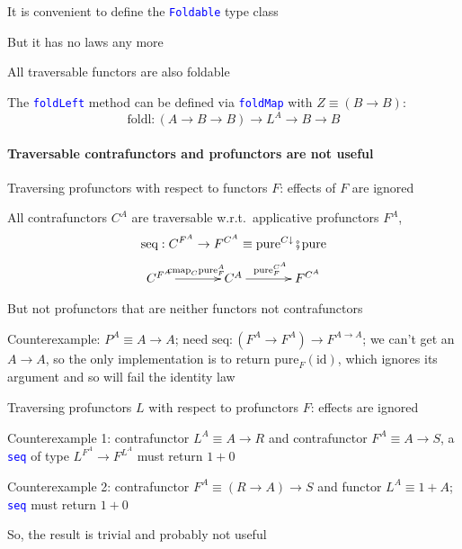 It is convenient to define the \texttt{\textcolor{blue}{\footnotesize{}Foldable}}
type class

But it has no laws any more

All traversable functors are also foldable

The \texttt{\textcolor{blue}{\footnotesize{}foldLeft}} method can
be defined via \texttt{\textcolor{blue}{\footnotesize{}foldMap}} with
$Z\equiv(B\rightarrow B)$:
\[
\text{foldl}:\left(A\rightarrow B\rightarrow B\right)\rightarrow L^{A}\rightarrow B\rightarrow B
\]


\paragraph{Traversable contrafunctors and profunctors are not useful}

\vspace{-0.15cm}Traversing profunctors with respect to functors $F$:
effects of $F$ are ignored

All contrafunctors $C^{A}$ are traversable w.r.t.~applicative profunctors
$F^{A}$,{\footnotesize{}
\[
\text{seq}:C^{F^{A}}\rightarrow F^{C^{A}}\equiv\text{pure}^{C\downarrow}\bef\text{pure}
\]
\[
\xymatrix{C^{F^{A}}\ar[r]\sp(0.5){\text{cmap}_{C}\text{pure}_{F}^{A}}\xyScaleY{0.2pc}\xyScaleX{3pc} & C^{A}\ar[r]\sp(0.5){\text{pure}_{F}^{C^{A}}} & F^{C^{A}}}
\]
}{\footnotesize\par}

But not profunctors that are neither functors not contrafunctors

Counterexample: $P^{A}\equiv A\rightarrow A$; need $\text{seq}:\left(F^{A}\rightarrow F^{A}\right)\rightarrow F^{A\rightarrow A}$;
we can't get an $A\rightarrow A$, so the only implementation is to
return $\text{pure}_{F}\left(\text{id}\right)$, which ignores its
argument and so will fail the identity law 

Traversing profunctors $L$ with respect to profunctors $F$: effects
are ignored

Counterexample 1: contrafunctor $L^{A}\equiv A\rightarrow R$ and
contrafunctor $F^{A}\equiv A\rightarrow S$, a \texttt{\textcolor{blue}{\footnotesize{}seq}}
of type $L^{F^{A}}\rightarrow F^{L^{A}}$ must return $1+0$

Counterexample 2: contrafunctor $F^{A}\equiv\left(R\rightarrow A\right)\rightarrow S$
and functor $L^{A}\equiv1+A$; \texttt{\textcolor{blue}{\footnotesize{}seq}}
must return $1+0$

So, the result is trivial and probably not useful

